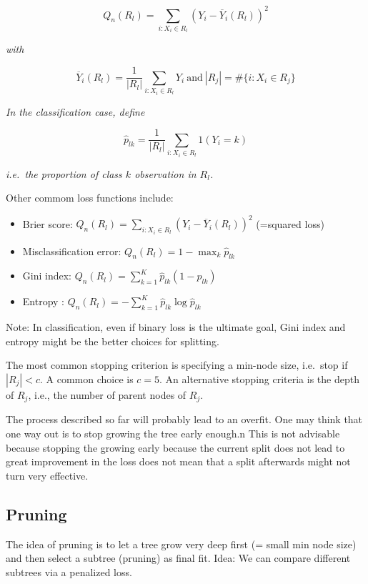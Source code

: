 \documentclass[a4paper,12pt,openany]{book}
\providecommand{\tightlist}{%
 \setlength{\itemsep}{0pt}\setlength{\parskip}{0pt}}
\begin{document}
\[
Q_n(R_l)= \sum_{i: X_i \in R_l} (Y_i - \overline Y_i(R_l))^2
\]

\emph{with}

\[
\overline Y_i(R_l)= \frac 1 {|R_l|}\sum_{i: X_i \in R_l}Y_i\ \text{and}\ |R_j|=\#\{i: X_i\in R_j\}
\]

\emph{In the classification case, define}

\[
\hat p_{lk}= \frac 1 {|R_l|} \sum_{i: X_i \in R_l}   1(Y_i=k)
\]

\emph{i.e.~the proportion of class \(k\) observation in \(R_l\).}

Other commom loss functions include:

\begin{itemize}
\tightlist
\item
  Brier score: \(Q_n(R_l)= \sum_{i: X_i \in R_l} (Y_i - \overline Y_i(R_l))^2\) (=squared loss)
\item
  Misclassification error: \(Q_n(R_l)= 1 - \max_{k}\hat p_{lk}\)
\item
  Gini index: \(Q_n(R_l)= \sum_{k=1}^K \hat p_{lk}(1-\hat p_{lk})\)
\item
  Entropy : \(Q_n(R_l)=-\sum_{k=1}^K \hat p_{lk}\log\hat p_{lk}\)
\end{itemize}

Note: In classification, even if binary loss is the ultimate goal, Gini index and entropy might be the better choices for splitting.

The most common stopping criterion is specifying a min-node size, i.e.~stop if \(|R_j|<c\). A common choice is \(c=5\). An alternative stopping criteria is the depth of \(R_j\), i.e., the number of parent nodes of \(R_j\).

The process described so far will probably lead to an overfit. One may think that one way out is to stop growing the tree early enough.n This is not advisable because stopping the growing early because the current split does not lead to great improvement in the loss does not mean that a split afterwards might not turn very effective.

\hypertarget{pruning}{%
\subsection{Pruning}\label{pruning}}

The idea of pruning is to let a tree grow very deep first (= small min node size) and then select a subtree (pruning) as final fit. Idea: We can compare different subtrees via a penalized loss.
\end{document}
